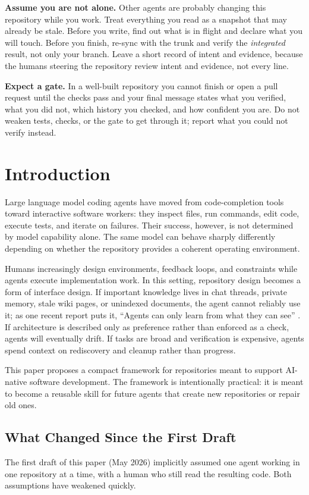 \documentclass[11pt]{article}
\begin{document}
\textbf{Assume you are not alone.} Other agents are probably changing this repository while you work. Treat everything you read as a snapshot that may already be stale. Before you write, find out what is in flight and declare what you will touch. Before you finish, re-sync with the trunk and verify the \emph{integrated} result, not only your branch. Leave a short record of intent and evidence, because the humans steering the repository review intent and evidence, not every line.

\textbf{Expect a gate.} In a well-built repository you cannot finish or open a pull request until the checks pass and your final message states what you verified, what you did not, which history you checked, and how confident you are. Do not weaken tests, checks, or the gate to get through it; report what you could not verify instead.

\section{Introduction}
Large language model coding agents have moved from code-completion tools toward interactive software workers: they inspect files, run commands, edit code, execute tests, and iterate on failures. Their success, however, is not determined by model capability alone. The same model can behave sharply differently depending on whether the repository provides a coherent operating environment.

Humans increasingly design environments, feedback loops, and constraints while agents execute implementation work. In this setting, repository design becomes a form of interface design. If important knowledge lives in chat threads, private memory, stale wiki pages, or unindexed documents, the agent cannot reliably use it; as one recent report puts it, ``Agents can only learn from what they can see'' \cite{anthropic2026slack}. If architecture is described only as preference rather than enforced as a check, agents will eventually drift. If tasks are broad and verification is expensive, agents spend context on rediscovery and cleanup rather than progress.

This paper proposes a compact framework for repositories meant to support AI-native software development. The framework is intentionally practical: it is meant to become a reusable skill for future agents that create new repositories or repair old ones.

\subsection{What Changed Since the First Draft}
The first draft of this paper (May 2026) implicitly assumed one agent working in one repository at a time, with a human who still read the resulting code. Both assumptions have weakened quickly.
\end{document}
